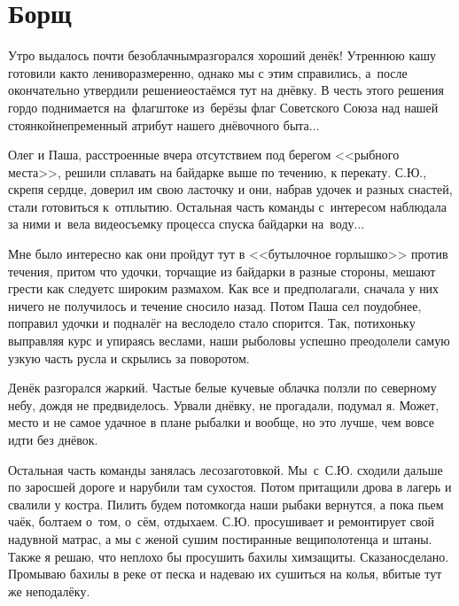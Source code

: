 \chapter{Борщ} 
\vepsianrose

Утро выдалось почти безоблачным\mdash разгорался хороший денёк! Утреннюю кашу готовили как\sdash то лениво\sdash размеренно, однако мы с этим справились, а~после окончательно утвердили решение\mdash остаёмся тут на днёвку. В честь этого решения гордо поднимается на~флагштоке из~берёзы флаг Советского Союза над нашей стоянкой\mdash непременный атрибут нашего днёвочного быта$\ldots$ 

Олег и Паша, расстроенные вчера отсутствием под берегом <<рыбного места>>, решили сплавать на байдарке выше по течению, к перекату. С.Ю., скрепя сердце, доверил им свою ласточку и они, набрав удочек и разных снастей, стали готовиться к~отплытию. Остальная часть команды с~интересом наблюдала за ними и~вела видеосъемку процесса спуска байдарки на~воду$\ldots$
 
Мне было интересно как они пройдут тут в <<бутылочное горлышко>> против течения, притом что удочки, торчащие из байдарки в разные стороны, мешают грести как следует\mdash с широким размахом. Как все и предполагали, сначала у них ничего не получилось и течение сносило назад. Потом Паша сел поудобнее, поправил удочки и подналёг на весло\mdash дело стало спорится. Так, потихоньку выправляя курс и упираясь веслами, наши рыболовы успешно преодолели самую узкую часть русла и скрылись за поворотом.

Денёк разгорался жаркий. Частые белые кучевые облачка ползли по северному небу, дождя не предвиделось. Урвали днёвку, не прогадали, подумал я. Может, место и не самое удачное в плане рыбалки и вообще, но это лучше, чем вовсе идти без днёвок.

Остальная часть команды занялась лесозаготовкой. Мы~с~С.Ю. сходили дальше по заросшей дороге и нарубили там сухостоя. Потом притащили дрова в лагерь и свалили у костра. Пилить будем потом\mdash когда наши рыбаки вернутся, а пока пьем чаёк, болтаем о~том, о~сём, отдыхаем. С.Ю. просушивает и ремонтирует свой надувной матрас, а мы с женой сушим постиранные вещи\mdash полотенца и штаны. Также я решаю, что неплохо бы просушить бахилы химзащиты. Сказано\mdash сделано. Промываю бахилы в реке от песка и надеваю их сушиться на колья, вбитые тут же неподалёку. 

